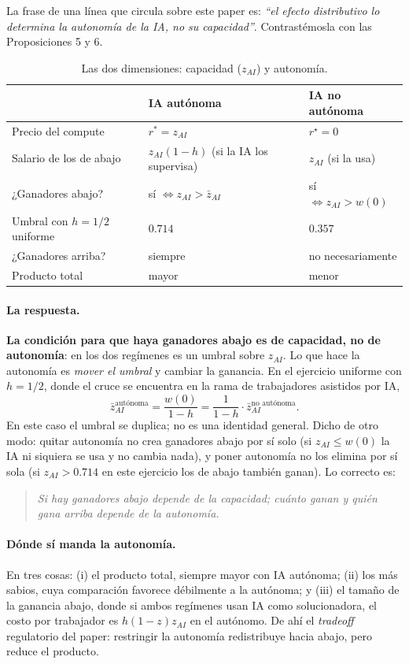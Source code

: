 \documentclass[11pt]{article}
\theoremstyle{definition}
\theoremstyle{remark}
\newcommand{\zai}{z_{AI}}
\begin{document}
La frase de una línea que circula sobre este paper es: \emph{``el efecto distributivo lo determina la
autonomía de la IA, no su capacidad''}. Contrastémosla con las Proposiciones 5 y 6.

\begin{table}[h]
\centering
\begin{tabular}{@{}lll@{}}
\toprule
 & \textbf{IA autónoma} & \textbf{IA no autónoma} \\ \midrule
Precio del compute & $r^{*}=\zai$ & $r^{\star}=0$ \\
Salario de los de abajo & $\zai(1-h)$ (si la IA los supervisa) & $\zai$ (si la usa) \\
¿Ganadores abajo? & sí $\iff \zai>\bar z_{AI}$ & sí $\iff \zai>w(0)$ \\[6pt]
Umbral con $h=1/2$ uniforme & $0.714$ & $0.357$ \\
¿Ganadores arriba? & siempre & no necesariamente \\
Producto total & mayor & menor \\ \bottomrule
\end{tabular}
\caption{Las dos dimensiones: capacidad ($\zai$) y autonomía.}
\end{table}

\paragraph{La respuesta.} \textbf{La condición para que haya ganadores abajo es de capacidad, no de
autonomía}: en los dos regímenes es un umbral sobre $\zai$. Lo que hace la autonomía es \emph{mover el
umbral} y cambiar la ganancia. En el ejercicio uniforme con $h=1/2$, donde el
cruce se encuentra en la rama de trabajadores asistidos por IA,
\[
  \bar z_{AI}^{\text{autónoma}}=\frac{w(0)}{1-h}
  =\frac{1}{1-h}\cdot \bar z_{AI}^{\text{no autónoma}} .
\]
En este caso el umbral se duplica; no es una identidad general. Dicho de otro modo: quitar autonomía no crea ganadores abajo por sí
solo (si $\zai\le w(0)$ la IA ni siquiera se usa y no cambia nada), y poner autonomía no los elimina por
sí sola (si $\zai>0.714$ en este ejercicio los de abajo también ganan). Lo correcto es:

\begin{quote}
\emph{Si hay ganadores abajo depende de la capacidad; cuánto ganan y quién gana arriba depende de la
autonomía.}
\end{quote}

\paragraph{Dónde sí manda la autonomía.} En tres cosas: (i) el producto total, siempre mayor con IA
autónoma; (ii) los más sabios, cuya comparación favorece débilmente a la autónoma; y (iii) el tamaño de la ganancia
abajo, donde si ambos regímenes usan IA como solucionadora, el costo por trabajador es $h(1-z)\zai$ en el autónomo. De ahí el \emph{tradeoff} regulatorio
del paper: restringir la autonomía redistribuye hacia abajo, pero reduce el producto.
\end{document}
